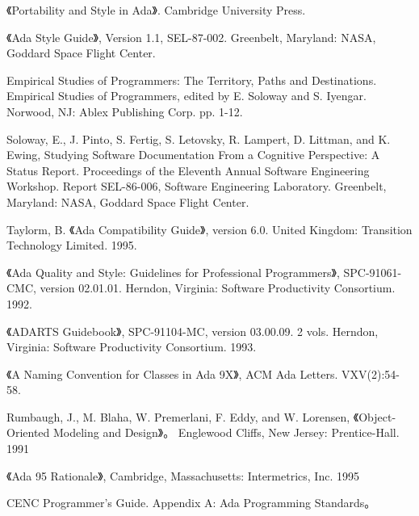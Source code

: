 \begin{thebibliography}{widest-label}
 《Portability and Style in Ada》.
Cambridge University Press.

 《Ada Style Guide》, Version 1.1, SEL-87-002. Greenbelt, Maryland: NASA, Goddard Space Flight Center.

 Empirical Studies of Programmers:
The Territory, Paths and Destinations. Empirical Studies of Programmers, edited by E. Soloway and S. Iyengar. Norwood, NJ: Ablex Publishing Corp. pp. 1-12.

 Soloway, E., J. Pinto, S. Fertig, S. Letovsky, R. Lampert, D. Littman, and K. Ewing,
Studying Software Documentation From a Cognitive Perspective: A Status Report. Proceedings of the Eleventh Annual Software Engineering Workshop. Report SEL-86-006, Software Engineering Laboratory. Greenbelt, Maryland: NASA, Goddard Space Flight Center. 

 Taylorm, B.
《Ada Compatibility Guide》, version 6.0. United Kingdom:
Transition Technology Limited. 1995.


 《Ada Quality and Style: Guidelines
for Professional Programmers》, SPC-91061-CMC, version 02.01.01.
Herndon, Virginia: Software Productivity Consortium. 1992.

 《ADARTS Guidebook》, SPC-91104-MC,
version 03.00.09. 2 vols. Herndon, Virginia: Software Productivity Consortium.
1993.

 《A Naming Convention for Classes in Ada 9X》, ACM Ada Letters. VXV(2):54-58.

 Rumbaugh, J., M. Blaha, W. Premerlani, F. Eddy, and W. Lorensen, 《Object-Oriented Modeling and Design》。
Englewood Cliffs, New Jersey: Prentice-Hall. 1991

 《Ada 95 Rationale》, Cambridge,
Massachusetts: Intermetrics, Inc. 1995

 CENC Programmer's Guide. Appendix A: Ada Programming Standards。

\end{thebibliography}
